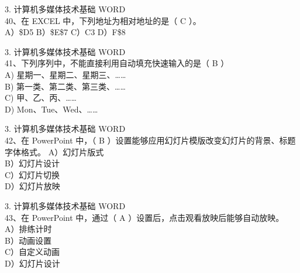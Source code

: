 \documentclass[aspectratio=169]{beamer}
\begin{document}
\begin{frame}[t]{3. 计算机多媒体技术基础} \vspace{20pt}
    WORD\\
40、在 EXCEL 中，下列地址为相对地址的是（ C ）。\\
A）\$D5 B）\$E\$7 C）C3 D）F\$8
\end{frame}



\begin{frame}[t]{3. 计算机多媒体技术基础} \vspace{20pt}
    WORD\\

41、下列序列中，不能直接利用自动填充快速输入的是（ B ）\\
A) 星期一、星期二、星期三、……\\
B) 第一类、第二类、第三类、……\\
C) 甲、乙、丙、……\\
D) Mon、Tue、Wed、……\\
\end{frame}


\begin{frame}[t]{3. 计算机多媒体技术基础} \vspace{20pt}
    WORD\\
42、在 PowerPoint 中，（ B ）设置能够应用幻灯片模版改变幻灯片的背景、标题字体格式。
A）幻灯片版式\\ B）幻灯片设计\\ C）幻灯片切换\\ D）幻灯片放映\\
\end{frame}



\begin{frame}[t]{3. 计算机多媒体技术基础} \vspace{20pt}
    WORD\\
43、在 PowerPoint 中，通过（ A ）设置后，点击观看放映后能够自动放映。\\
A）排练计时\\
B）动画设置\\
C）自定义动画\\
D）幻灯片设计\\
\end{frame}
\end{document}
